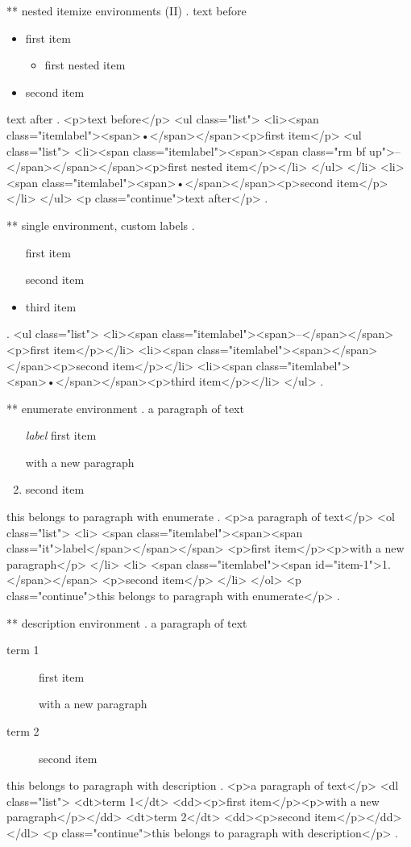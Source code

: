 ** nested itemize environments (II)
.
text before
\begin{itemize}
    \item first item
        \begin{itemize}
            \item first nested item
        \end{itemize}
    \item second item
\end{itemize}
text after
.
<p>text before</p>
<ul class="list">
<li><span class="itemlabel"><span>•</span></span><p>ﬁrst item</p>
<ul class="list">
<li><span class="itemlabel"><span><span class="rm bf up">–</span></span></span><p>ﬁrst nested item</p></li>
</ul>
</li>
<li><span class="itemlabel"><span>•</span></span><p>second item</p></li>
</ul>
<p class="continue">text after</p>
.


** single environment, custom labels
.
\begin{itemize}
    \item[\textendash] first item
    \item[] second item
    \item third item
\end{itemize}
.
<ul class="list">
<li><span class="itemlabel"><span>–</span></span><p>ﬁrst item</p></li>
<li><span class="itemlabel"><span></span></span><p>second item</p></li>
<li><span class="itemlabel"><span>•</span></span><p>third item</p></li>
</ul>
.



** enumerate environment
.
a paragraph of text

\begin{enumerate}
    \item[\itshape label] first item

        with a new paragraph
    \item second item
\end{enumerate}
this belongs to paragraph with enumerate
.
<p>a paragraph of text</p>
<ol class="list">
<li>
<span class="itemlabel"><span><span class="it">label</span></span></span>
<p>ﬁrst item</p><p>with a new paragraph</p>
</li>
<li>
<span class="itemlabel"><span id="item-1">1.</span></span>
<p>second item</p>
</li>
</ol>
<p class="continue">this belongs to paragraph with enumerate</p>
.


** description environment
.
a paragraph of text

\begin{description}
    \item[term 1] first item

        with a new paragraph
    \item[term 2] second item
\end{description}
this belongs to paragraph with description
.
<p>a paragraph of text</p>
<dl class="list">
<dt>term 1</dt>
<dd><p>ﬁrst item</p><p>with a new paragraph</p></dd>
<dt>term 2</dt>
<dd><p>second item</p></dd>
</dl>
<p class="continue">this belongs to paragraph with description</p>
.


